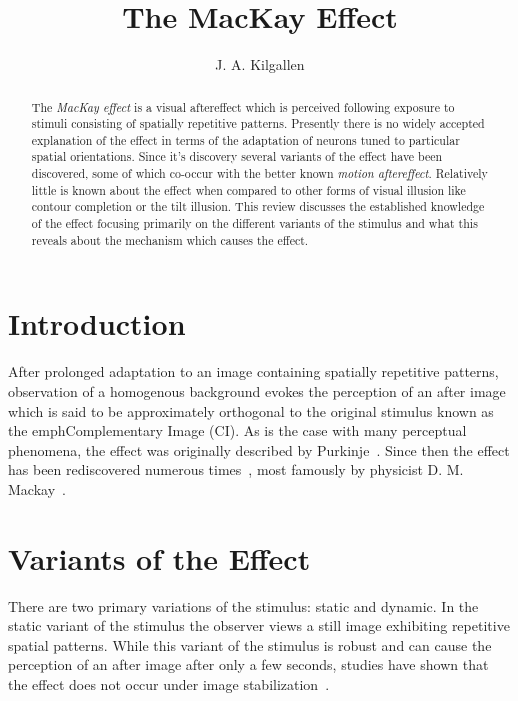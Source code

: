 \documentclass[twocolumn]{article}
\begin{document}
\title{The MacKay Effect}
\author{J. A. Kilgallen}
\maketitle

\begin{abstract}
The \emph{MacKay effect} is a visual aftereffect which is perceived following exposure to stimuli
consisting of spatially repetitive patterns. Presently there is no widely accepted explanation
of the effect in terms of the adaptation of neurons tuned to particular spatial orientations. 
Since it's discovery several variants of the effect have been discovered, some of which co-occur with
the better known \emph{motion aftereffect}. Relatively little is known about the effect when compared to other forms of 
visual illusion like contour completion or the tilt illusion. This review discusses the established knowledge of the effect
focusing primarily on the different variants of the stimulus and what this reveals about the mechanism which causes the effect.
\end{abstract}

\section[]{Introduction}
After prolonged adaptation to an image containing spatially repetitive patterns, 
observation of a homogenous background evokes the perception of an after image 
which is said to be approximately orthogonal to the original stimulus known as the emph{Complementary Image} (CI)\cite{mackay_1957a,mackay_1957b}. 
As is the case with many perceptual phenomena, the effect was originally described by Purkinje~\cite{wade_1977}.
Since then the effect has been rediscovered numerous times~\cite{wade_1977}, most famously by physicist D. M. Mackay~\cite{mackay_1957a}.

\section[]{Variants of the Effect}
There are two primary variations of the stimulus: static and dynamic. 
In the static variant of the stimulus the observer views a still image exhibiting repetitive
spatial patterns. While this variant of the stimulus is robust and can cause the perception of an after image
after only a few seconds, studies have shown that the effect does not occur under image stabilization~\cite{pritchard_1958}.
\end{document}
